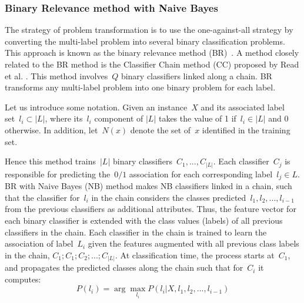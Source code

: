 \documentclass[11pt]{article}
\begin{document}
\subsubsection{Binary Relevance method with Naive Bayes}
The strategy of problem transformation is to use the one-against-all strategy by converting the multi-label problem into several binary classification problems. This approach is known as the binary relevance method (BR)~\cite{read2011classifier}. A method closely related to the BR method is the Classifier Chain method (CC) proposed by Read et al. \cite{read2011classifier}. This method involves~$Q$ binary classifiers linked along a chain. BR transforms any multi-label problem into one binary problem for each label. 

Let us introduce some notation. Given an instance~$X$ and its associated label set~$l_i \subset |L|$, where its~$l_i$ component of  $ |L|$ takes the value of 1 if~$l_i \in |L|$ and 0 otherwise. In addition, let~$N(x)$ denote the set of~$x$ identified in the training set.

Hence this method trains~$|L|$ binary classifiers~$C_1,...,C_{|L|}$. Each classifier~$C_j$ is responsible for predicting the~$0/1$ association for each corresponding label~$l_j \in L$.\\

BR with Naive Bayes (NB) method makes NB classifiers linked in a chain, such that the classifier for~$l_{i}$ in the chain considers the classes predicted~$l_1,l_2,...,l_{i-1}$ from the previous classifiers as additional attributes. Thus, the feature vector for each binary classifier is extended with the class values (labels) of all previous classifiers in the chain. Each classifier in the chain is trained to learn the association of label~$L_i$
given the features augmented with all previous class labels in the chain, $ C_1;C_1;C_2;...;C_{|L|}$. At classification time, the process starts at~$C_1$, and propagates the predicted classes along   the   chain   such   that   for~$C_i$ it   computes: 
\begin{equation}
P(l_i)= \arg \max_{l_i} P(l_i|X,l_1,l_2,...,l_{i-1}) 
\end{equation}
\end{document}
